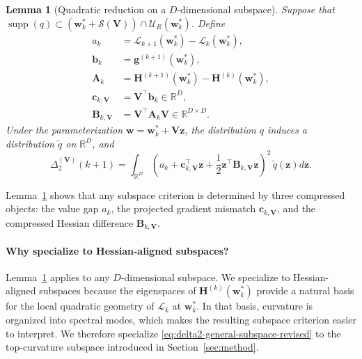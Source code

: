 \documentclass[10pt]{article}
\theoremstyle{plain}
\newtheorem{lemma}[theorem]{Lemma}
\theoremstyle{remark}
\begin{document}
\begin{lemma}[Quadratic reduction on a $D$-dimensional subspace]
\label{lem:general-subspace-reduction}
Suppose that $\operatorname{supp}(q)\subset (\mathbf w_k^*+\mathcal S(\mathbf V))\cap \mathcal U_R(\mathbf w_k^*)$.
Define
\begin{align*}
a_k &= \mathcal L_{k+1}(\mathbf w_k^*)-\mathcal L_k(\mathbf w_k^*), \\
\mathbf b_k &= \mathbf g^{(k+1)}(\mathbf w_k^*), \\
\mathbf A_k &= \mathbf H^{(k+1)}(\mathbf w_k^*)-\mathbf H^{(k)}(\mathbf w_k^*), \\
\mathbf c_{k,\mathbf V} &= \mathbf V^\top \mathbf b_k \in \mathbb R^D, \\
\mathbf B_{k,\mathbf V} &= \mathbf V^\top \mathbf A_k \mathbf V \in \mathbb R^{D\times D}.
\end{align*}
Under the parameterization $\mathbf w=\mathbf w_k^*+\mathbf V\mathbf z$, the distribution $q$ induces a distribution $\tilde q$ on $\mathbb R^D$, and
\begin{equation}
\label{eq:general-subspace-reduction-integral}
\Delta_2^{(\mathbf V)}(k+1)
=
\int_{\mathbb R^D}
\left(
a_k + \mathbf c_{k,\mathbf V}^\top \mathbf z + \frac12 \mathbf z^\top \mathbf B_{k,\mathbf V}\mathbf z
\right)^2
\, \tilde q(\mathbf z) d\mathbf z.
\end{equation}
\end{lemma}

Lemma~\ref{lem:general-subspace-reduction} shows that any subspace criterion is determined by three compressed objects: the value gap $a_k$, the projected gradient mismatch $\mathbf c_{k,\mathbf V}$, and the compressed Hessian difference $\mathbf B_{k,\mathbf V}$.

\paragraph{Why specialize to Hessian-aligned subspaces?}
Lemma~\ref{lem:general-subspace-reduction} applies to any $D$-dimensional subspace.
We specialize to Hessian-aligned subspaces because the eigenspaces of $\mathbf H^{(k)}(\mathbf w_k^*)$ provide a natural basis for the local quadratic geometry of $\mathcal L_k$ at $\mathbf w_k^*$.
In that basis, curvature is organized into spectral modes, which makes the resulting subspace criterion easier to interpret.
We therefore specialize \eqref{eq:delta2-general-subspace-revised} to the top-curvature subspace introduced in Section~\ref{sec:method}.
\end{document}
